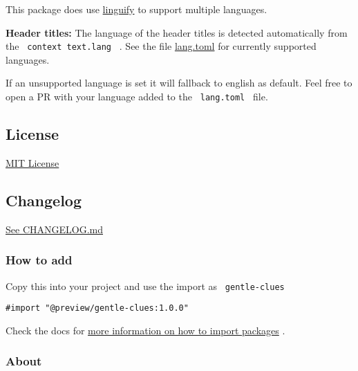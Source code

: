 This package does use
\href{https://github.com/jomaway/typst-linguify}{linguify} to support
multiple languages.

\textbf{Header titles:} The language of the header titles is detected
automatically from the \texttt{\ context\ text.lang\ } . See the file
\href{https://github.com/jomaway/typst-gentle-clues/blob/main/lib/lang.toml}{lang.toml}
for currently supported languages.

If an unsupported language is set it will fallback to english as
default. Feel free to open a PR with your language added to the
\texttt{\ lang.toml\ } file.

\subsection{License}\label{license}

\href{https://github.com/typst/packages/raw/main/packages/preview/gentle-clues/1.0.0/LICENSE}{MIT
License}

\subsection{Changelog}\label{changelog}

\href{https://github.com/typst/packages/raw/main/packages/preview/gentle-clues/1.0.0/CHANGELOG.md}{See
CHANGELOG.md}

\subsubsection{How to add}\label{how-to-add}

Copy this into your project and use the import as
\texttt{\ gentle-clues\ }

\begin{verbatim}
#import "@preview/gentle-clues:1.0.0"
\end{verbatim}



Check the docs for
\href{https://typst.app/docs/reference/scripting/\#packages}{more
information on how to import packages} .

\subsubsection{About}\label{about}

